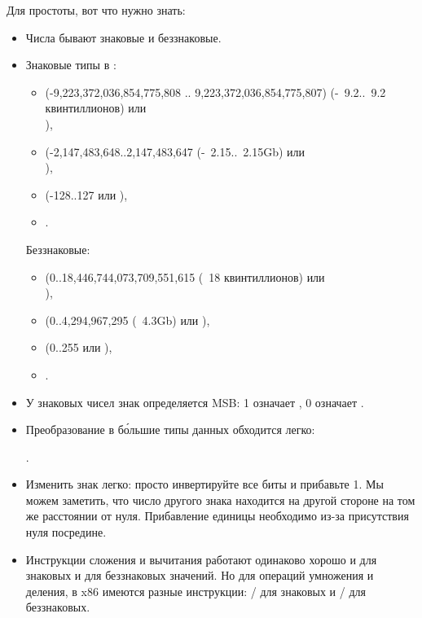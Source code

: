 Для простоты, вот что нужно знать:

\begin{itemize}
\item Числа бывают знаковые и беззнаковые.

\item Знаковые типы в \CCpp:

  \begin{itemize}
    \item {} (-9,223,372,036,854,775,808 .. 9,223,372,036,854,775,807) 
	  (-~9.2..~9.2 квинтиллионов) или \\
                ),
    \item \Tint (-2,147,483,648..2,147,483,647 (-~2.15..~2.15Gb) или \\
	    ),
    \item \Tchar (-128..127 или ),
    \item {}.
   \end{itemize}

	Беззнаковые:
  \begin{itemize}
	  \item {} (0..18,446,744,073,709,551,615 
		  (~18 квинтиллионов) или \\
                        ),
   \item {} (0..4,294,967,295 (~4.3Gb) или ),
   \item {} (0..255 или ), 
   \item {}.
  \end{itemize}

\item У знаковых чисел знак определяется \ac{MSB}: 1 означает , 0 означает .

\item Преобразование в б\'{о}льшие типы данных обходится легко:

	.

\label{sec:signednumbers:negation}
\item Изменить знак легко: просто инвертируйте все биты и прибавьте 1.
Мы можем заметить, что число другого знака находится на другой стороне на том же расстоянии от нуля.
Прибавление единицы необходимо из-за присутствия нуля посредине.

\item Инструкции сложения и вычитания работают одинаково хорошо и для знаковых и для беззнаковых значений.
	Но для операций умножения и деления, в x86 имеются разные инструкции:
	/ для знаковых и / для беззнаковых.


\end{itemize}
